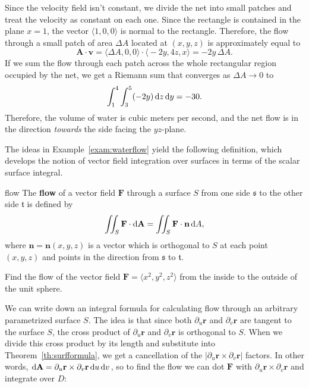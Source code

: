 \documentclass{watsonbook}
\begin{document}
\begin{solution}
  Since the velocity field isn't constant, we divide the net into
  small patches and treat the velocity as constant on each one. Since
  the rectangle is contained in the plane $x=1$, the vector
  $\langle 1, 0, 0 \rangle$ is normal to the rectangle. Therefore, the flow
  through a small patch of area $\Delta A$ located at $(x,y,z)$ is
  approximately equal to
  \[
    \mathbf{A} \cdot \mathbf{v} = \big\langle \Delta A, 0, 0 \big\rangle \cdot
    \big\langle -2y, 4z, x \big\rangle = -2y \, \Delta A. 
  \]
  If we sum the flow through each patch across the whole rectangular
  region occupied by the net, we get a Riemann sum that converges as
  $\Delta A \to 0$ to
  \[
    \int_1^4 \int_3^5 (-2y) \, \mathrm{d} z \, \mathrm{d} y = -30. 
  \]
  Therefore, the volume of water is  cubic meters per second, and the
  net flow is in the direction \textit{towards} the side facing the $yz$-plane. 
\end{solution}

The ideas in Example~\ref{exam:waterflow} yield the following
definition, which develops the notion of vector field integration over
surfaces in terms of the scalar surface
integral. 

\begin{defn}{}{flow}
  The \textbf{flow} of a vector field $\mathbf{F}$ through a surface
  $S$ from one side $\mathfrak{s}$ to the other side $\mathfrak{t}$ is defined by
  \[
    \iint_S \mathbf{F} \cdot \mathrm{d}\mathbf{A} =  \iint_S \mathbf{F} \cdot \mathbf{n}
    \, {\mathrm{d}}A, 
  \]
  where $\mathbf{n}=\mathbf{n}(x,y,z)$ is a vector which is
  orthogonal to $S$ at each point $(x,y,z)$ and points in the
  direction from $\mathfrak{s}$ to $\mathfrak{t}$. 
\end{defn}

\begin{exercise}{}{}
  Find the flow of the vector field $\mathbf{F} = \langle x^2, y^2, z^2 \rangle$
  from the inside to the outside of the unit sphere. 
\end{exercise}

We can write down an integral formula for calculating flow through an
arbitrary parametrized surface $S$. The idea is that since both
$\partial_u \mathbf{r}$ and $\partial_v \mathbf{r}$ are tangent to the
surface $S$, the cross product of $\partial_u \mathbf{r} $ and
$\partial_v \mathbf{r}$ is orthogonal to $S$. When we divide this
cross product by its length and substitute into
Theorem~\ref{th:surfformula}, we get a cancellation of the
$|\partial_u \mathbf{r} \times \partial_v \mathbf{r}|$ factors. In
other words,
$\mathrm{d}\mathbf{A} = \partial_u \mathbf{r} \times \partial_v \mathbf{r} \,
\mathrm{d} u \, \mathrm{d} v$, so to find the flow we can dot $\mathbf{F}$ with
$\partial_u \mathbf{r} \times \partial_v \mathbf{r}$ and integrate over $D$: 
\end{document}
